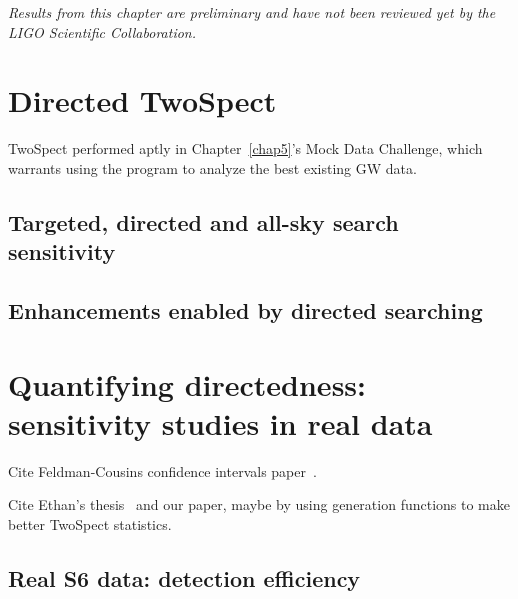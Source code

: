 
\textit{Results from this chapter are preliminary and have not been reviewed yet by the LIGO Scientific Collaboration.}

        \section{Directed TwoSpect}
        \label{directed}

TwoSpect performed aptly in Chapter~\ref{chap5}'s Mock Data Challenge, which warrants using the program to analyze the best existing GW data.


            \subsection{Targeted, directed and all-sky search sensitivity}
            \label{tradeoffs}


            \subsection{Enhancements enabled by directed searching}
            \label{directed_enhancements}


        \section{Quantifying directedness: sensitivity studies in real data}
        \label{quant_directed}



            Cite Feldman-Cousins confidence intervals paper~\cite{FeldmanCousins1998}.

            Cite Ethan's thesis~\cite{RomeroThesis} and our paper, maybe by using generation functions to make better TwoSpect statistics.


        \subsection{Real S6 data: detection efficiency}

